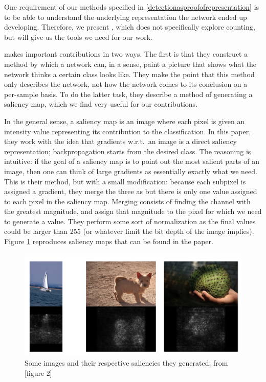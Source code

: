 One requirement of our methods specified in \ref{detectionasproofofrepresentation} is to be able
to understand the underlying representation the network ended up developing. Therefore, we present
\cite{simonyan2014deep}, which does not specifically explore counting, but will give us the tools
we need for our work.

\cite{simonyan2014deep} makes important contributions in two ways. The first is that they construct
a method by which a network can, in a sense, paint a picture that shows what the network thinks
a certain class looks like. They make the point that this method only describes the network, not
how the network comes to its conclusion on a per-sample basis. To do the latter task, they describe a method
of generating a saliency map, which we find very useful for our contributions.

In the general sense, a saliency map is an image where each pixel is given an intensity value
representing its contribution to the classification. In this paper, they work with the idea that
gradients w.r.t.\ an image is a direct saliency representation; backpropagation starts from the
desired class. The reasoning is intuitive: if the goal of a saliency map is to point out the most
salient parts of an image, then one can think of large gradients as essentially exactly what we need.
This is their method, but with a small modification: because each subpixel is assigned a gradient,
they merge the three as but there is only one value assigned to each pixel in the saliency map.
Merging consists of finding the channel with the greatest magnitude, and assign that magnitude to
the pixel for which we need to generate a value. They perform some sort of normalization as
the final values could be larger than 255 (or whatever limit the bit depth of the image implies).
Figure \ref{figure2simonyan} reproduces saliency maps that can be found in the paper.

\begin{figure}
    \begin{center}
        \includegraphics[width = \textwidth]{Counting/LaTeX/figures/simonyanfigure.png}
    \end{center}
    \caption{Some images and their respective saliencies they generated; from \cite{simonyan2014deep}[figure 2]}
    \label{figure2simonyan}
\end{figure}

